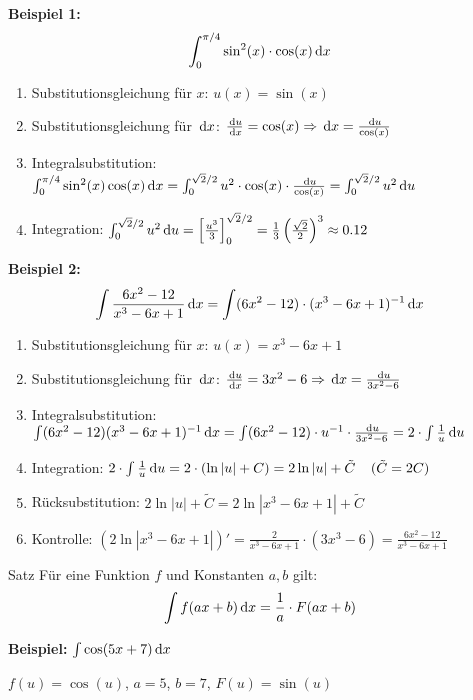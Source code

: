 \textbf{Beispiel 1:} \[\int_0^{\pi / 4} \sin^2(x) \cdot \cos(x) \,\mathrm{d}x\]
\begin{enumerate}
    \item Substitutionsgleichung für $x$: $u(x) = \sin(x)$
    \item Substitutionsgleichung für $\,\mathrm{d}x$: $\frac{\,\mathrm{d}u}{\,\mathrm{d}x} = \cos(x) \Rightarrow \,\mathrm{d}x = \frac{\,\mathrm{d}u}{\cos(x)}$
    \item Integralsubstitution: $\int_{0}^{\pi / 4} \sin^2(x)\cos(x) \,\mathrm{d}x = \int_{0}^{\sqrt{2}/2} u^2 \cdot \cos(x) \cdot \frac{\,\mathrm{d}u}{\cos(x)} = \int_{0}^{\sqrt{2} / 2} u^2 \,\mathrm{d}u$
    \item Integration: $\int_{0}^{\sqrt{2} / 2} u^2 \,\mathrm{d}u = \left[ \frac{u^3}{3} \right]_{0}^{\sqrt{2}/2} = \frac{1}{3} \left( \frac{\sqrt{2}}{2} \right)^3 \approx 0.12$
\end{enumerate}

\textbf{Beispiel 2:} \[ \int \frac{6x^2 - 12}{x^3 - 6x + 1} \,\mathrm{d}x = \int (6x^2 - 12) \cdot (x^3 - 6x + 1)^{-1} \,\mathrm{d}x \]
\begin{enumerate}
    \item Substitutionsgleichung für $x$: $u(x) = x^3 - 6x + 1$
    \item Substitutionsgleichung für $\,\mathrm{d}x$: $\frac{\,\mathrm{d}u}{\,\mathrm{d}x} = 3x^2 - 6 \Rightarrow \,\mathrm{d}x = \frac{\,\mathrm{d}u}{3x^2 - 6}$
    \item Integralsubstitution: $\int (6x^2 - 12)(x^3 - 6x + 1)^{-1} \,\mathrm{d}x = \int (6x^2 -12) \cdot u^{-1} \cdot \frac{\,\mathrm{d}u}{3x^2 - 6} = 2 \cdot \int \frac{1}{u} \,\mathrm{d}u$
    \item Integration: $2 \cdot \int \frac{1}{u} \,\mathrm{d}u = 2 \cdot (\ln |u| + C) = 2 \ln |u| + \tilde{C} \;\;\;\; (\tilde{C} = 2C)$
    \item Rücksubstitution: $2 \ln |u| + \tilde{C} = 2 \ln |x^3 - 6x + 1| + \tilde{C}$
    \item Kontrolle: $(2 \ln |x^3 - 6x + 1|)' = \frac{2}{x^3 -6x + 1} \cdot (3x^3 - 6) = \frac{6x^2 - 12}{x^3 - 6x + 1}$
\end{enumerate}

\begin{subbox}{Satz}
    Für eine Funktion $f$ und Konstanten $a,b$ gilt: \[\int f(ax + b) \,\mathrm{d}x = \frac{1}{a} \cdot F(ax + b)\]
\end{subbox}

\textbf{Beispiel:} $\int \cos(5x + 7) \,\mathrm{d}x$

$f(u) = \cos(u)$, $a = 5$, $b = 7$, $F(u) = \sin(u)$

